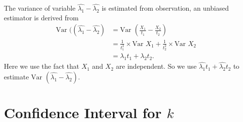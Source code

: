 \documentclass[11pt,a4paper,english]{article}
\begin{document}
The variance of variable $\hat{\lambda_{1}}-\hat{\lambda_{2}}$ is estimated from observation, an unbiased estimator is derived from
\[
	\begin{aligned}
		\text{Var }((\hat{\lambda_{1}}-\hat{\lambda_{2}}) &= \text{Var }(\frac{X_{1}}{t_{1}}-\frac{X_{2}}{t_{2}})\\
		&= \frac{1}{t_{1}^{2}}\times \text{Var }X_{1}+\frac{1}{t_{2}^{2}}\times \text{Var }X_{2}\\
		&= \lambda_{1} t_{1}+\lambda_{2} t_{2}.
	\end{aligned}
\]
Here we use the fact that $X_{1}$ and $X_{2}$ are independent. So we use $\hat{\lambda_{1}}t_{1}+\hat{\lambda_{2}}t_{2}$ to estimate $\text{Var }(\hat{\lambda_{1}}-\hat{\lambda_{2}})$.
\section{Confidence Interval for $k$}
\end{document}
